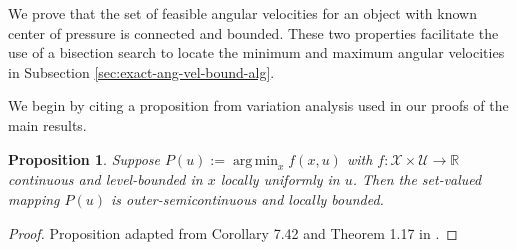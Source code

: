 \documentclass[conference]{IEEEtran}
\newtheorem{proposition}{Proposition}
\DeclareMathOperator*{\argmin}{arg\,min}
\begin{document}


We prove that the set of feasible angular velocities for an object
with known center of pressure is connected and bounded. These two
properties facilitate the use of a bisection search to locate the
minimum and maximum angular velocities in Subsection
\ref{sec:exact-ang-vel-bound-alg}.

We begin by citing a proposition from variation analysis used in our
proofs of the main results.
\begin{proposition}\label{prop:var-analysis}
  Suppose $P(u) := \argmin_x f(x,u)$ with
  $f:\mathcal{X}\times\mathcal{U}\rightarrow\mathbb{R}$ continuous and
  level-bounded in $x$ locally uniformly in $u$. Then the set-valued
  mapping $P(u)$ is outer-semicontinuous and locally bounded.
\end{proposition}

\begin{proof}
  Proposition adapted from Corollary 7.42 and Theorem 1.17 in
  \cite{Rockafellar}.
\end{proof}
\end{document}
